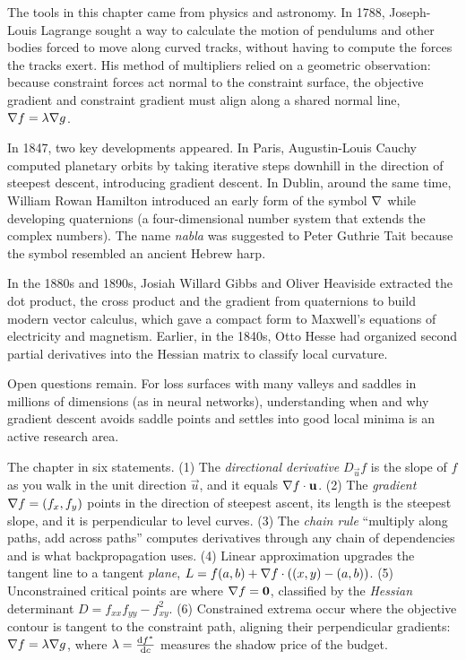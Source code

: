 \begin{historybox}
The tools in this chapter came from physics and astronomy. In 1788, Joseph-Louis Lagrange sought a way to calculate the motion of pendulums and other bodies forced to move along curved tracks, without having to compute the forces the tracks exert. His method of multipliers relied on a geometric observation: because constraint forces act normal to the constraint surface, the objective gradient and constraint gradient must align along a shared normal line, $\nabla f = \lambda \nabla g$.

In 1847, two key developments appeared. In Paris, Augustin-Louis Cauchy computed planetary orbits by taking iterative steps downhill in the direction of steepest descent, introducing gradient descent. In Dublin, around the same time, William Rowan Hamilton introduced an early form of the symbol $\nabla$ while developing quaternions (a four-dimensional number system that extends the complex numbers). The name \emph{nabla} was suggested to Peter Guthrie Tait because the symbol resembled an ancient Hebrew harp.

In the 1880s and 1890s, Josiah Willard Gibbs and Oliver Heaviside extracted the dot product, the cross product and the gradient from quaternions to build modern vector calculus, which gave a compact form to Maxwell's equations of electricity and magnetism. Earlier, in the 1840s, Otto Hesse had organized second partial derivatives into the Hessian matrix to classify local curvature.

Open questions remain. For loss surfaces with many valleys and saddles in millions of dimensions (as in neural networks), understanding when and why gradient descent avoids saddle points and settles into good local minima is an active research area.
\end{historybox}

\begin{recoverybox}
The chapter in six statements. (1) The
\emph{directional derivative} $D_{\vec u}f$ is the slope of $f$ as you walk in the
unit direction $\vec u$, and it equals $\nabla f\cdot\mathbf{u}$. (2) The
\emph{gradient} $\nabla f = (f_x,f_y)$ points in the direction of steepest ascent,
its length is the steepest slope, and it is perpendicular to level curves. (3) The
\emph{chain rule} ``multiply along paths, add across paths'' computes derivatives
through any chain of dependencies and is what backpropagation uses. (4) Linear
approximation upgrades the tangent line to a tangent \emph{plane},
$L = f(a,b) + \nabla f\cdot((x,y)-(a,b))$. (5) Unconstrained critical points are where
$\nabla f = \mathbf{0}$, classified by the \emph{Hessian} determinant $D=f_{xx}f_{yy}-f_{xy}^2$.
(6) Constrained extrema occur where the objective contour is tangent to the constraint path,
aligning their perpendicular gradients: $\nabla f = \lambda \nabla g$, where $\lambda = \frac{\mathrm{d} f^*}{\mathrm{d} c}$
measures the shadow price of the budget.
\end{recoverybox}

